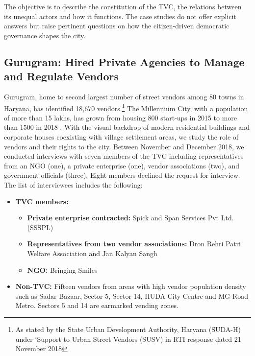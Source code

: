 \documentclass[a4paper, 12pt, twoside]{article}
\begin{document}
The objective is to describe the constitution of the TVC, the relations between its unequal actors and how it functions. The case studies do not offer explicit answers but raise pertinent questions on how the citizen-driven democratic governance shapes the city.

\subsection*{Gurugram: Hired Private Agencies to Manage and Regulate Vendors}

Gurugram, home to second largest number of street vendors among 80 towns in Haryana, has identified 18,670 vendors.\footnote{As stated by the State Urban Development Authority, Haryana (SUDA-H) under ‘Support to Urban Street Vendors (SUSV) in RTI response dated 21 November 2018} The Millennium City, with a population of more than 15 lakhs, has grown from housing 800 start-ups in 2015 to more than 1500 in 2018 \parencite{vermanews}. With the visual backdrop of modern residential buildings and corporate houses coexisting with village settlement areas, we study the role of vendors and their rights to the city.
Between November and December 2018, we conducted interviews with seven members of the TVC including representatives from an NGO (one), a private enterprise (one), vendor associations (two), and government officials (three). Eight members declined the request for interview. The list of interviewees includes the following:

\begin{itemize}
\item \textbf{TVC members:}
	\begin{itemize}
	\item \textbf{Private enterprise contracted:} Spick and Span Services Pvt Ltd. (SSSPL)
	\item \textbf{Representatives from two vendor associations:} Dron Rehri Patri Welfare Association and Jan Kalyan Sangh
	\item \textbf{NGO:} Bringing Smiles
	\end{itemize}
\item \textbf{Non-TVC:} Fifteen vendors from areas with high vendor population density such as Sadar Bazaar, Sector 5, Sector 14, HUDA City Centre and MG Road Metro. Sectors 5 and 14 are earmarked vending zones.
\end{itemize}
\end{document}
